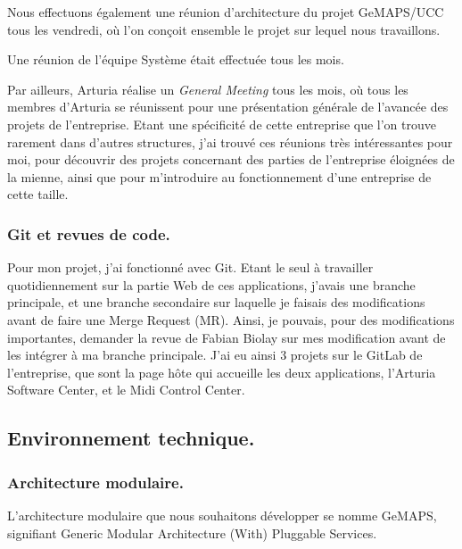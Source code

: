 \documentclass[francais]{rapportPFE}  %
\begin{document}
Nous effectuons également une réunion d'architecture du projet GeMAPS/UCC tous les vendredi, où l'on conçoit ensemble le projet sur lequel nous travaillons. 

Une réunion de l'équipe Système était effectuée tous les mois.

Par ailleurs, Arturia réalise un \textit{General Meeting} tous les mois, où tous les membres d'Arturia se réunissent pour une présentation générale de l'avancée des projets de l'entreprise. Etant une spécificité de cette entreprise que l'on trouve rarement dans d'autres structures, j'ai trouvé ces réunions très intéressantes pour moi, pour découvrir des projets concernant des parties de l'entreprise éloignées de la mienne, ainsi que pour m'introduire au fonctionnement d'une entreprise de cette taille.


\subsubsection{Git et revues de code.}
Pour mon projet, j'ai fonctionné avec Git. Etant le seul à travailler quotidiennement sur la partie Web de ces applications, j'avais une branche principale, et une branche secondaire sur laquelle je faisais des modifications avant de faire une Merge Request (MR). Ainsi, je pouvais, pour des modifications importantes, demander la revue de Fabian Biolay sur mes modification avant de les intégrer à ma branche principale. J'ai eu ainsi 3 projets sur le GitLab de l'entreprise, que sont la page hôte qui accueille les deux applications, l'Arturia Software Center, et le Midi Control Center.

\subsection{Environnement technique.}

\subsubsection{Architecture modulaire.}
L'architecture modulaire que nous souhaitons développer se nomme GeMAPS, signifiant Generic Modular Architecture (With) Pluggable Services. 
\end{document}
